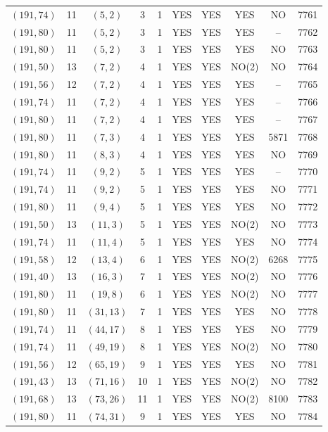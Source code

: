 \begin{longtable}{|c|c|c|c|c|c|c|c|c|c|}
$(191, 74)$ & 11 & $(5, 2)$ & 3 & 1 & YES & YES & YES & NO & 7761\\
$(191, 80)$ & 11 & $(5, 2)$ & 3 & 1 & YES & YES & YES & -- & 7762\\
$(191, 80)$ & 11 & $(5, 2)$ & 3 & 1 & YES & YES & YES & NO & 7763\\
$(191, 50)$ & 13 & $(7, 2)$ & 4 & 1 & YES & YES & NO(2) & NO & 7764\\
$(191, 56)$ & 12 & $(7, 2)$ & 4 & 1 & YES & YES & YES & -- & 7765\\
$(191, 74)$ & 11 & $(7, 2)$ & 4 & 1 & YES & YES & YES & -- & 7766\\
$(191, 80)$ & 11 & $(7, 2)$ & 4 & 1 & YES & YES & YES & -- & 7767\\
$(191, 80)$ & 11 & $(7, 3)$ & 4 & 1 & YES & YES & YES & 5871 & 7768\\
$(191, 80)$ & 11 & $(8, 3)$ & 4 & 1 & YES & YES & YES & NO & 7769\\
$(191, 74)$ & 11 & $(9, 2)$ & 5 & 1 & YES & YES & YES & -- & 7770\\
$(191, 74)$ & 11 & $(9, 2)$ & 5 & 1 & YES & YES & YES & NO & 7771\\
$(191, 80)$ & 11 & $(9, 4)$ & 5 & 1 & YES & YES & YES & NO & 7772\\
$(191, 50)$ & 13 & $(11, 3)$ & 5 & 1 & YES & YES & NO(2) & NO & 7773\\
$(191, 74)$ & 11 & $(11, 4)$ & 5 & 1 & YES & YES & YES & NO & 7774\\
$(191, 58)$ & 12 & $(13, 4)$ & 6 & 1 & YES & YES & NO(2) & 6268 & 7775\\
$(191, 40)$ & 13 & $(16, 3)$ & 7 & 1 & YES & YES & NO(2) & NO & 7776\\
$(191, 80)$ & 11 & $(19, 8)$ & 6 & 1 & YES & YES & NO(2) & NO & 7777\\
$(191, 80)$ & 11 & $(31, 13)$ & 7 & 1 & YES & YES & YES & NO & 7778\\
$(191, 74)$ & 11 & $(44, 17)$ & 8 & 1 & YES & YES & YES & NO & 7779\\
$(191, 74)$ & 11 & $(49, 19)$ & 8 & 1 & YES & YES & NO(2) & NO & 7780\\
$(191, 56)$ & 12 & $(65, 19)$ & 9 & 1 & YES & YES & YES & NO & 7781\\
$(191, 43)$ & 13 & $(71, 16)$ & 10 & 1 & YES & YES & NO(2) & NO & 7782\\
$(191, 68)$ & 13 & $(73, 26)$ & 11 & 1 & YES & YES & NO(2) & 8100 & 7783\\
$(191, 80)$ & 11 & $(74, 31)$ & 9 & 1 & YES & YES & YES & NO & 7784\\

\end{longtable}
